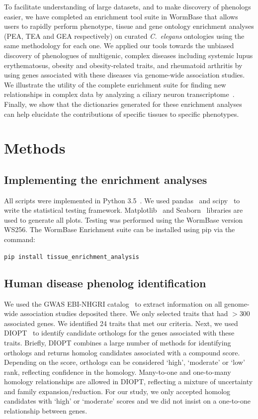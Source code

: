 \documentclass[10pt,letterpaper,twocolumn]{article}
\newcommand{\cel}{\emph{C.~elegans}}
\begin{document}
To facilitate understanding of large datasets, and to make discovery of
phenologs easier, we have completed an enrichment tool suite in WormBase
that allows users to rapidly perform phenotype, tissue and gene ontology
enrichment analyses (PEA, TEA and GEA respectively) on curated \cel{} ontologies
using the same methodology for each one.
We applied our tools towards the unbiased discovery of phenologues of
multigenic, complex diseases including
systemic lupus erythematosus, obesity and obesity-related traits,  and
rheumatoid arthritis
by using genes associated with these
diseases via genome-wide association studies. We illustrate the utility of
the complete enrichment suite for finding new relationships in complex data by
analyzing a ciliary neuron transcriptome~\cite{Wang2015}. Finally, we show that
the dictionaries generated for these enrichment analyses can help elucidate the
contributions of specific tissues to specific phenotypes.

\section*{Methods}
\subsection*{Implementing the enrichment analyses}
All scripts were implemented in Python 3.5~\cite{Rossum2011}. We used
pandas~\cite{McKinney2011} and scipy~\cite{Oliphant2007} to write the
statistical testing framework. Matplotlib~\cite{Hunter2007} and Seaborn~\cite{Waskom}
libraries are used to generate all plots. Testing was performed using the
WormBase version WS256. The WormBase Enrichment suite can be installed using
pip via the command:

\texttt{pip install tissue\_enrichment\_analysis}


\subsection*{Human disease phenolog identification}
We used the GWAS EBI-NHGRI catalog~\cite{MacArthur2016} to extract information
on all genome-wide
association studies deposited there. We only selected traits that had $>300$
associated genes. We identified 24 traits that met our criteria. Next, we used
DIOPT~\cite{Hu2011} to identify candidate orthologs for the genes associated with these
traits. Briefly, DIOPT combines a large number of methods for identifying orthologs
and returns homolog candidates associated with a compound score. Depending on the score,
orthologs can be considered `high', `moderate' or `low' rank, reflecting confidence
in the homology. Many-to-one and one-to-many homology relationships are allowed
in DIOPT, reflecting a mixture of uncertainty and family expansion/reduction.
For our study, we only accepted homolog candidates with `high' or `moderate' scores
and we did not insist on a one-to-one relationship between genes.
\end{document}

